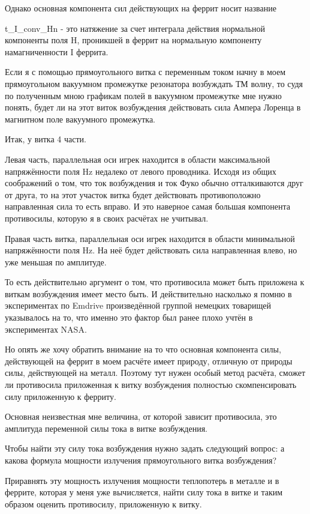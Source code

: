 \documentclass[11pt]{article}
\begin{document}
Однако основная компонента сил действующих на феррит носит название

t\_I\_conv\_Hn - это натяжение за счет интеграла действия нормальной
компоненты поля H, проникшей в феррит на нормальную компоненту
намагниченности I феррита.

Если я с помощью прямоугольного витка с переменным током начну в моем
прямоугольном вакуумном промежутке резонатора возбуждать ТМ волну, то
судя по полученным мною графикам полей в вакуумном промежутке мне нужно
понять, будет ли на этот виток возбуждения действовать сила Ампера
Лоренца в магнитном поле вакуумного промежутка.

Итак, у витка 4 части.

Левая часть, параллельная оси игрек находится в области максимальной
напряжённости поля Hz недалеко от левого проводника. Исходя из общих
соображений о том, что ток возбуждения и ток Фуко обычно отталкиваются
друг от друга, то на этот участок витка будет действовать противоположно
направленная сила то есть вправо. И это наверное самая большая
компонента противосилы, которую я в своих расчётах не учитывал.

Правая часть витка, параллельная оси игрек находится в области
минимальной напряжённости поля Hz. На неё будет действовать сила
направленная влево, но уже меньшая по амплитуде.

То есть действительно аргумент о том, что противосила может быть
приложена к виткам возбуждения имеет место быть. И действительно
насколько я помню в экспериментах по Emdrive произведённой группой
немецких товарищей указывалось на то, что именно это фактор был ранее
плохо учтён в экспериментах NASA.

Но опять же хочу обратить внимание на то что основная компонента силы,
действующей на феррит в моем расчёте имеет природу, отличную от природы
силы, действующей на металл. Поэтому тут нужен особый метод расчёта,
сможет ли противосила приложенная к витку возбуждения полностью
скомпенсировать силу приложенную к ферриту.

Основная неизвестная мне величина, от которой зависит противосила, это
амплитуда переменной силы тока в витке возбуждения.

Чтобы найти эту силу тока возбуждения нужно задать следующий вопрос: а
какова формула мощности излучения прямоугольного витка возбуждения?

Приравнять эту мощность излучения мощности теплопотерь в металле и в
феррите, которая у меня уже вычисляется, найти силу тока в витке и таким
образом оценить противосилу, приложенную к витку.
\end{document}
